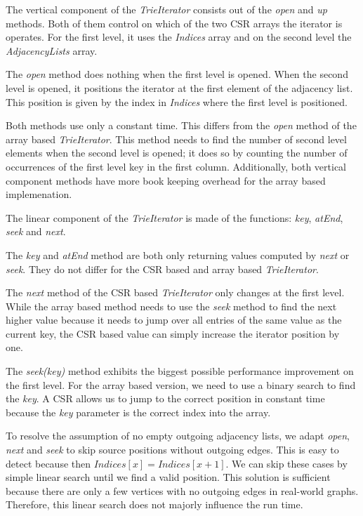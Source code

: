 The vertical component of the \textit{TrieIterator} consists out of the \textit{open} and \textit{up} methods.
Both of them control on which of the two \textsc{CSR} arrays the iterator is operates.
For the first level, it uses the \textit{Indices} array and on the second level the \textit{AdjacencyLists} array.

The \textit{open} method does nothing when the first level is opened.
When the second level is opened, it positions the iterator at the first element of the adjacency list.
This position is given by the index in \textit{Indices} where the first level is positioned.

Both methods use only a constant time.
This differs from the \textit{open} method of the array based \textit{TrieIterator}.
This method needs to find the number of second level elements when the second level is opened;
it does so by counting the number of occurrences of the first level key in the first column.
Additionally, both vertical component methods have more book keeping overhead for the array based implemenation.

The linear component of the \textit{TrieIterator} is made of the functions: \textit{key}, \textit{atEnd}, \textit{seek} and
\textit{next}.

The \textit{key} and \textit{atEnd} method are both only returning values computed by \textit{next} or \textit{seek}.
They do not differ for the \textsc{CSR} based and array based \textit{TrieIterator}.

The \textit{next} method of the CSR based \textit{TrieIterator} only changes at the first level.
While the array based method needs to use the \textit{seek} method to find the next higher value because
it needs to jump over all entries of the same value as the current key, the CSR based value can simply increase
the iterator position by one.

The \textit{seek(key)} method exhibits the biggest possible performance improvement on the first level.
For the array based version, we need to use a binary search to find the \textit{key}.
A CSR allows us to jump to the correct position in constant time because the \textit{key} parameter is the correct
index into the array.

To resolve the assumption of no empty outgoing adjacency lists, we adapt \textit{open}, \textit{next} and \textit{seek} to skip source
positions without outgoing edges.
This is easy to detect because then $Indices[x] = Indices[x + 1]$.
We can skip these cases by simple linear search until we find a valid position.
This solution is sufficient because there are only a few vertices with no outgoing edges in real-world graphs.
Therefore, this linear search does not majorly influence the run time.

